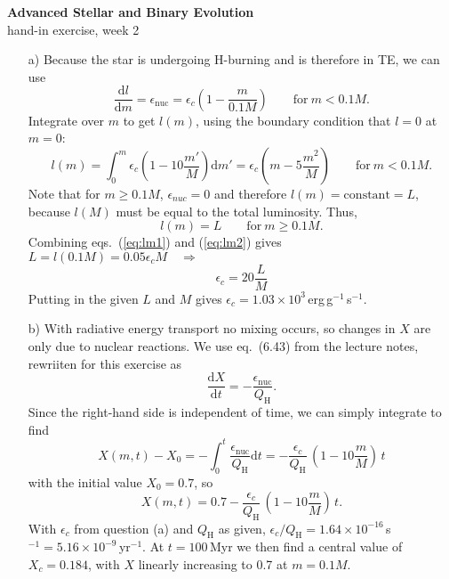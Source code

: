 \documentclass[a4paper,11pt]{article}
\newcommand\der{\ensuremath{\mathrm{d}}}
\begin{document}
\begin{center}
{\Large\bf Advanced Stellar and Binary Evolution} \\ [1ex]
{\large hand-in exercise, week 2}

\end{center}

\begin{itemize}
\item[a)] Because the star is undergoing H-burning and is therefore in TE, we can use
\[ \frac{\der l}{\der m} = \epsilon_\mathrm{nuc} = \epsilon_c\left( 1-\frac{m}{0.1M}\right) \qquad \mathrm{for}\ m < 0.1M. \]
Integrate over $m$ to get $l(m)$, using the boundary condition that $l=0$ at $m=0$:
\begin{equation} \label{eq:lm1}
l(m) = \int_0^m \epsilon_c\left(1 - 10\frac{m'}{M}\right) \der m' = \epsilon_c\left(m - 5\frac{m^2}{M}\right) \qquad \mathrm{for}\ m < 0.1M. 
\end{equation}
Note that for $m \geq 0.1M$, $\epsilon_{nuc} = 0$ and therefore $l(m) = \mathrm{constant} = L$, because $l(M)$ must be equal to the total luminosity. Thus,
\begin{equation} \label{eq:lm2}
l(m) = L  \qquad \mathrm{for}\ m \geq 0.1M.
\end{equation}
Combining eqs.~(\ref{eq:lm1}) and (\ref{eq:lm2}) gives $L = l(0.1M) = 0.05\epsilon_c M \quad\Rightarrow$
\begin{equation} \label{eq:epsc}
\epsilon_c = 20\frac{L}{M} 
\end{equation}
Putting in the given $L$ and $M$ gives $\epsilon_c = 1.03\times10^3$\,erg\,g$^{-1}$\,s$^{-1}$.

\item[b)] With radiative energy transport no mixing occurs, so changes in $X$ are only due to nuclear reactions. We use eq.~(6.43) from the lecture notes, rewriiten for this exercise as
\[
\frac{\der X}{\der t} = - \frac{\epsilon_\mathrm{nuc}}{Q_\mathrm{H}}.
\]
Since the right-hand side is independent of time, we can simply integrate to find
\[
X(m,t) - X_0 = -\int_0^t \frac{\epsilon_\mathrm{nuc}}{Q_\mathrm{H}} \der t = - \frac{\epsilon_c}{Q_\mathrm{H}}\, \left( 1 - 10\frac{m}{M} \right)\,t
\]
with the initial value $X_0=0.7$, so
\[
X(m,t) = 0.7 - \frac{\epsilon_c}{Q_\mathrm{H}}\, \left( 1 - 10\frac{m}{M} \right)\,t.
\]
With $\epsilon_c$ from question (a) and $Q_\mathrm{H}$ as given, $\epsilon_c/Q_\mathrm{H} = 1.64\times10^{-16}$\,s$^{-1} = 5.16\times10^{-9}$\,yr$^{-1}$. At $t=100$\,Myr we then find a central value of $X_c = 0.184$, with $X$ linearly increasing to 0.7 at $m=0.1M$.



\end{itemize}
\end{document}
